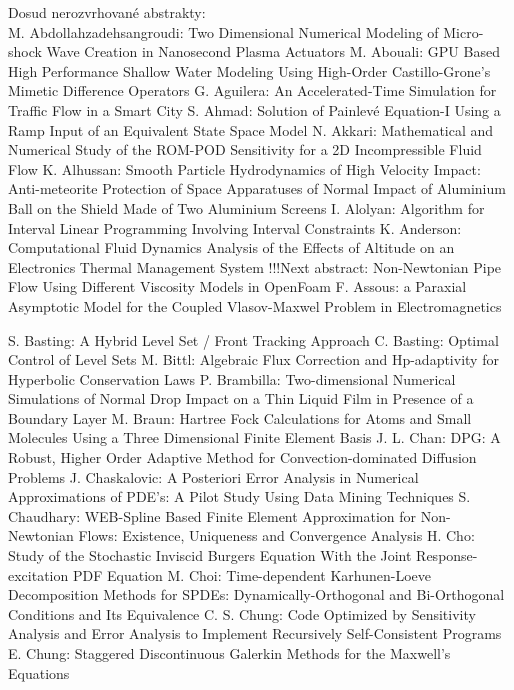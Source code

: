 \documentclass[10pt, A4]{article}%
\begin{document}
\newpage
Dosud nerozvrhované abstrakty:\\
{M. Abdollahzadehsangroudi}: {Two Dimensional Numerical Modeling of Micro-shock Wave Creation in Nanosecond Plasma Actuators}
{M. Abouali}: {GPU Based High Performance Shallow Water Modeling Using High-Order Castillo-Grone's Mimetic Difference Operators}
{G. Aguilera}: {An Accelerated-Time Simulation for Traffic Flow in a Smart City}
{S. Ahmad}: {Solution of Painlevé Equation-I Using a Ramp Input of an Equivalent State Space Model}
{N. Akkari}: {Mathematical and Numerical Study of the ROM-POD Sensitivity for a 2D Incompressible Fluid Flow}
{K. Alhussan}: {Smooth Particle Hydrodynamics of High Velocity Impact: Anti-meteorite Protection of Space Apparatuses of Normal Impact of Aluminium Ball on the Shield Made of Two Aluminium Screens}
{I. Alolyan}: {Algorithm for Interval Linear  Programming Involving Interval Constraints}
{K. Anderson}: {Computational Fluid Dynamics Analysis of the Effects of Altitude on an Electronics Thermal Management System       !!!Next abstract: Non-Newtonian Pipe Flow Using Different Viscosity Models in OpenFoam}
{F. Assous}: {a Paraxial Asymptotic Model for the Coupled Vlasov-Maxwel Problem in Electromagnetics}

{S. Basting}: {A Hybrid Level Set / Front Tracking Approach}
{C. Basting}: {Optimal Control of Level Sets}
{M. Bittl}: {Algebraic Flux Correction and Hp-adaptivity for Hyperbolic Conservation Laws}
{P. Brambilla}: {Two-dimensional Numerical Simulations of Normal Drop Impact on a Thin Liquid Film in Presence of a Boundary Layer}
{M. Braun}: {Hartree Fock Calculations for Atoms and Small Molecules Using  a Three Dimensional  Finite Element Basis}
{J. L. Chan}: {DPG: A Robust, Higher Order Adaptive Method for Convection-dominated Diffusion Problems}
{J. Chaskalovic}: {A Posteriori Error Analysis in Numerical Approximations of PDE's: A Pilot Study Using Data Mining Techniques}
{S. Chaudhary}: {WEB-Spline Based Finite Element Approximation for Non-Newtonian Flows: Existence, Uniqueness and Convergence Analysis}
{H. Cho}: {Study of the Stochastic Inviscid Burgers Equation With the Joint Response-excitation PDF Equation}
{M. Choi}: {Time-dependent Karhunen-Loeve Decomposition Methods for SPDEs: Dynamically-Orthogonal and Bi-Orthogonal Conditions and Its Equivalence}
{C. S. Chung}: {Code Optimized by Sensitivity Analysis and Error Analysis to Implement Recursively Self-Consistent Programs}
{E. Chung}: {Staggered Discontinuous Galerkin Methods for the Maxwell's Equations}
\end{document}
